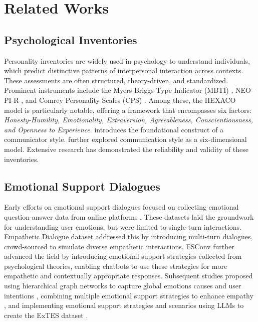 \section{Related Works}
\subsection{Psychological Inventories}
Personality inventories are widely used in psychology to understand individuals, which predict distinctive patterns of interpersonal interaction across contexts.
These assessments are often structured, theory-driven, and standardized.
Prominent instruments include the Myers-Briggs Type Indicator (MBTI) \citep{mbti}, NEO-PI-R \citep{costa2008revised}, and Comrey Personality Scales (CPS) \citep{cps}. Among these, the HEXACO model \citep{ashton2009hexaco} is particularly notable, offering a framework that encompasses six factors: \textit{Honesty-Humility, Emotionality, Extraversion, Agreeableness, Conscientiousness, and Openness to Experience}.
\citet{norton1978foundation} introduces the foundational construct of a communicator style. \citet{de2013communication} further explored communication style as a six-dimensional model.
Extensive research \citep{capraro2002myers, costa1992four, lee2004psychometric} has demonstrated the reliability and validity of these inventories.

\subsection{Emotional Support Dialogues}
Early efforts on emotional support dialogues focused on collecting emotional question-answer data from online platforms \citep{medeiros2018using, sharma2020computational, turcan-mckeown-2019-dreaddit, garg-etal-2022-cams}. These datasets laid the groundwork for understanding user emotions, but were limited to single-turn interactions.
Empathetic Dialogue dataset \citep{empatheticdialogue} addressed this by introducing multi-turn dialogues, crowd-sourced to simulate diverse empathetic interactions.
ESConv \citep{esconv} further advanced the field by introducing emotional support strategies collected from psychological theories, enabling chatbots to use these strategies for more empathetic and contextually appropriate responses.
Subsequent studies proposed using hierarchical graph networks to capture global emotions causes and user intentions \citep{peng2022control}, combining multiple emotional support strategies to enhance empathy \citep{tu-etal-2022-misc}, and implementing emotional support strategies and scenarios using LLMs to create the ExTES dataset \citep{zheng2024self}.


